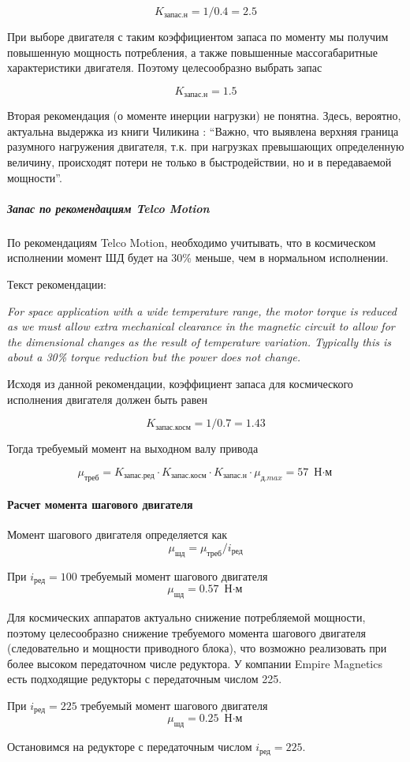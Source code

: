 $$
    K_\textit{запас.н} = 1 / 0.4 = 2.5
$$

При выборе двигателя с таким коэффициентом запаса по моменту мы получим повышенную
мощность потребления, а также повышенные массогабаритные характеристики двигателя.
Поэтому целесообразно выбрать запас

$$
    K_\textit{запас.н} = 1.5
$$

Вторая рекомендация (о моменте инерции нагрузки) не понятна. Здесь, вероятно,
актуальна выдержка из книги Чиликина \cite{Chilikin}: ``Важно, что выявлена верхняя
граница разумного нагружения двигателя, т.к. при нагрузках превышающих определенную
величину, происходят потери не только в быстродействии, но и в передаваемой мощности''.

\subparagraph{Запас по рекомендациям Telco Motion}
По рекомендациям Telco Motion, необходимо учитывать, что в космическом исполнении
момент ШД будет на 30\% меньше, чем в нормальном исполнении.

Текст рекомендации:
\begin{otherlanguage}{english}
    \textit{For space application with a wide temperature range, the motor torque is reduced
    as we must allow extra mechanical clearance in the magnetic circuit to allow for
    the dimensional changes as the result of temperature variation. Typically this
    is about a 30\% torque reduction but the power does not change.}
\end{otherlanguage}

Исходя из данной рекомендации, коэффициент запаса для космического исполнения
двигателя должен быть равен

$$
    K_\textit{запас.косм} = 1 / 0.7 = 1.43
$$

Тогда требуемый момент на выходном валу привода

$$
    \mu_\textit{треб} =
                K_\textit{запас.ред} \cdot K_\textit{запас.косм}
                \cdot K_\textit{запас.н} \cdot \mu_\textit{д.max}
                = 57 \text{ Н$\cdot$м}
$$

\paragraph{Расчет момента шагового двигателя}

Момент шагового двигателя определяется как
\begin{equation}
    \mu_\textit{шд} = \mu_\textit{треб} / i_\text{ред}
    \label{stepper_engine_torque}
\end{equation}


При $i_\text{ред} = 100$ требуемый момент шагового двигателя
$$
    \mu_\textit{шд} = 0.57 \text{ Н$\cdot$м}
$$

Для космических аппаратов актуально снижение потребляемой мощности, поэтому
целесообразно снижение требуемого момента шагового двигателя
(следовательно и мощности приводного блока), что возможно реализовать при более
высоком передаточном числе редуктора. У компании Empire Magnetics есть подходящие
редукторы с передаточным числом 225.

При $i_\text{ред} = 225$ требуемый момент шагового двигателя
$$
    \mu_\textit{шд} = 0.25 \text{ Н$\cdot$м}
$$

Остановимся на редукторе с передаточным числом $i_\text{ред} = 225$.
